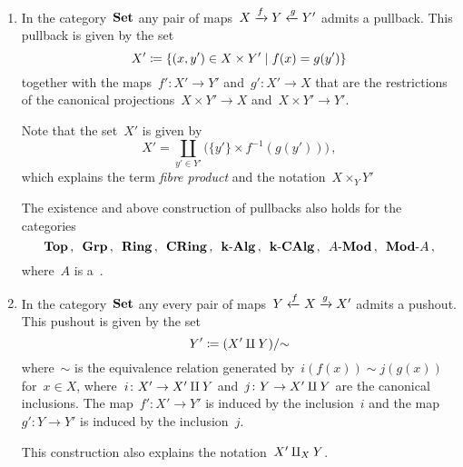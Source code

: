 \begin{example*}
  \leavevmode
  \begin{enumerate}
    \item
      In the category~$\mathbf{Set}$ any pair of maps~$X \xrightarrow{f} Y \xleftarrow{g} Y'$ admits a pullback.
      This pullback is given by the set
      \[
                  X'
        \defined  \{
                    (x,y') \in X \times Y'
                  \suchthat
                    f(x) = g(y')
                  \}
      \]
      together with the maps~$f' \colon X' \to Y'$ and~$g' \colon X' \to X$ that are the restrictions of the canonical projections~$X \times Y' \to X$ and~$X \times Y' \to Y'$.
      
      Note that the set~$X'$ is given by
      \[
          X'
        = \coprod_{y' \in Y'} \bigl( \{ y' \} \times f^{-1}(g(y')) \bigr)  \,,
      \]
      which explains the term \emph{fibre product} and the notation~$X \times_Y Y'$
      
      The existence and above construction of pullbacks also holds for the categories
      \[
        \mathbf{Top} \,,
        \enskip
        \mathbf{Grp} \,,
        \enskip
        \mathbf{Ring} \,,
        \enskip
        \mathbf{CRing} \,,
        \enskip
        \text{$\mathbf{k}$-$\mathbf{Alg}$} \,,
        \enskip
        \text{$\mathbf{k}$-$\mathbf{CAlg}$} \,,
        \enskip
        \text{$A$-$\mathbf{Mod}$} \,,
        \enskip
        \text{$\mathbf{Mod}$-$A$} \,,
      \]
      where~$A$ is a~{\kalg}.
    \item
      In the category~$\mathbf{Set}$ any every pair of maps~$Y \xleftarrow{f} X \xrightarrow{g} X'$ admits a pushout.
      This pushout is given by the set
      \[
                  Y'
        \coloneqq  (X' \amalg Y) / {\sim}
      \]
      where~$\sim$ is the equivalence relation generated by~$i(f(x)) \sim j(g(x))$ for~$x \in X$, where~$i \colon X' \to X' \amalg Y$ and~$j \colon Y \to X' \amalg Y$ are the canonical inclusions.
      The map~$f' \colon X' \to Y'$ is induced by the inclusion~$i$ and the map~$g' \colon Y \to Y'$ is induced by the inclusion~$j$.
      
      This construction also explains the notation~$X' \amalg_X Y$.
  \end{enumerate}
\end{example*}


